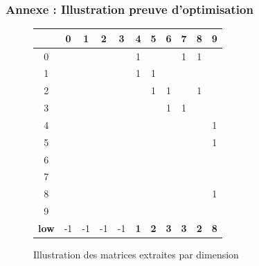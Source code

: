 \documentclass{beamer}
\begin{document}
\begin{frame}
    \frametitle{Annexe : Illustration preuve d'optimisation}
    \begin{figure}
        \begin{tabular}{ c |c | c | c | c | c | c | c | c | c | c }
              & 0 & 1 & 2 & 3 & 4 & 5 & 6 & 7 & 8 & 9 \\ \hline
            0 &   &   &   &   & \cellcolor{red!25}1 & \cellcolor{red!25}  & \cellcolor{red!25}  & \cellcolor{red!25}1 & \cellcolor{red!25}1 &   \\ \hline
            1 &   &   &   &   & \cellcolor{red!25}1 & \cellcolor{red!25}1 & \cellcolor{red!25}  & \cellcolor{red!25}  & \cellcolor{red!25}  &   \\ \hline
            2 &   &   &   &   & \cellcolor{red!25}  & \cellcolor{red!25}1 & \cellcolor{red!25}1 & \cellcolor{red!25}  & \cellcolor{red!25}1 &   \\ \hline
            3 &   &   &   &   & \cellcolor{red!25}  & \cellcolor{red!25}  & \cellcolor{red!25}1 & \cellcolor{red!25}1 & \cellcolor{red!25}  &   \\ \hline
            4 &   &   &   &   &   &   &   &   &   & \cellcolor{blue!25}1 \\ \hline
            5 &   &   &   &   &   &   &   &   &   & \cellcolor{blue!25}1 \\ \hline
            6 &   &   &   &   &   &   &   &   &   & \cellcolor{blue!25}  \\ \hline
            7 &   &   &   &   &   &   &   &   &   & \cellcolor{blue!25}  \\ \hline
            8 &   &   &   &   &   &   &   &   &   & \cellcolor{blue!25}1 \\ \hline
            9 &   &   &   &   &   &   &   &   &   &   \\ \hline 
            \textbf{low} & -1 & -1 & -1 & -1 & \textbf{1} & \textbf{2} & \textbf{3} & 
            \textbf{3} & \textbf{2} & \textbf{8}
        \end{tabular}
        \centering
        \caption{Illustration des matrices extraites par dimension}
    \end{figure}
\end{frame}
\end{document}
